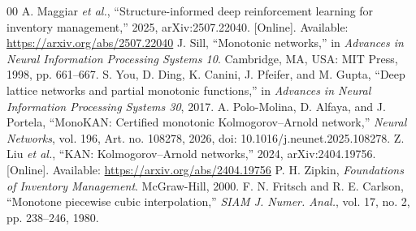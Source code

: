 \documentclass[conference]{IEEEtran}
\begin{document}
\begin{thebibliography}{00}
 A. Maggiar \textit{et al.}, ``Structure-informed deep reinforcement learning for inventory
management,'' 2025, arXiv:2507.22040. [Online]. Available: \url{https://arxiv.org/abs/2507.22040}
 J. Sill, ``Monotonic networks,'' in \textit{Advances in Neural Information Processing Systems 10}.
Cambridge, MA, USA: MIT Press, 1998, pp. 661--667.
 S. You, D. Ding, K. Canini, J. Pfeifer, and M. Gupta, ``Deep lattice networks and partial monotonic
functions,'' in \textit{Advances in Neural Information Processing Systems 30}, 2017.
 A. Polo-Molina, D. Alfaya, and J. Portela, ``MonoKAN: Certified monotonic Kolmogorov--Arnold
network,'' \textit{Neural Networks}, vol. 196, Art. no. 108278, 2026, doi: 10.1016/j.neunet.2025.108278.
 Z. Liu \textit{et al.}, ``KAN: Kolmogorov--Arnold networks,'' 2024, arXiv:2404.19756. [Online].
Available: \url{https://arxiv.org/abs/2404.19756}
 P. H. Zipkin, \textit{Foundations of Inventory Management}. McGraw-Hill, 2000.
 F. N. Fritsch and R. E. Carlson, ``Monotone piecewise cubic interpolation,'' \textit{SIAM J.
Numer. Anal.}, vol. 17, no. 2, pp. 238--246, 1980.
\end{thebibliography}
\end{document}
